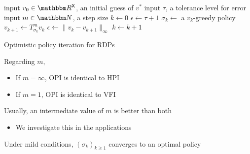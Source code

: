 \begin{frame}
    
    {\small
    \begin{algorithm}[H]
        \DontPrintSemicolon
        input $v_0 \in \RR^\Xsf$, an initial guess of $v^*$ \;
        input $\tau$, a tolerance level for error \;
        input $m \in \NN$, a step size \;
        $k \leftarrow 0$ \;
        $\epsilon \leftarrow \tau + 1$ \;
        \While{$\epsilon > \tau $}
        {
            $\sigma_k \leftarrow $ a $v_k$-greedy policy \;
            $v_{k+1} \leftarrow T_{\sigma_k}^m v_k$  \;
            $\epsilon \leftarrow \| v_k - v_{k+1} \|_\infty$ \;
            $k \leftarrow k + 1$ \;
        }
        \caption{Optimistic policy iteration for RDPs}
    \end{algorithm}
    }

\end{frame}


\begin{frame}
    
    Regarding $m$,
    \begin{itemize}
        \item If $m=\infty$, OPI is identical to HPI
    \vspace{0.5em}
        \item If $m=1$, OPI is identical to VFI
    \end{itemize}

    \vspace{0.5em}
    Usually, an intermediate value of $m$ is better than both

    \vspace{0.5em}
    \begin{itemize}
        \item We investigate this in the applications 
    \end{itemize}
    \vspace{0.5em}
    \vspace{0.5em}
    \vspace{0.5em}

    Under mild conditions, $(\sigma_k)_{k \geq 1}$ converges to an optimal policy

\end{frame}













